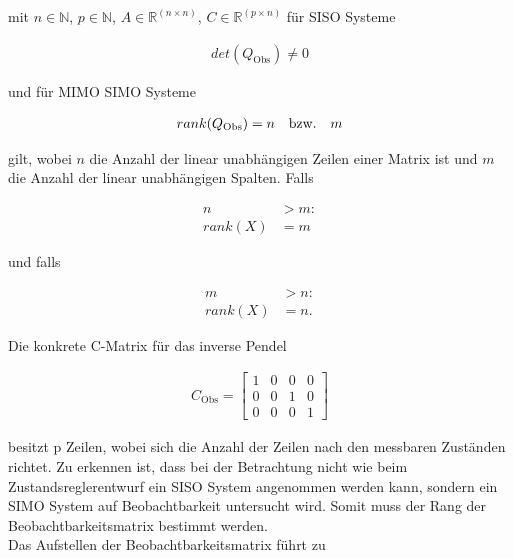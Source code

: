 mit $n\in\mathbb{N}$, $p\in\mathbb{N}$, $A\in\mathbb{R}^{(n\times n)}$, $C\in\mathbb{R}^{(p\times n)}$ für SISO Systeme

\begin{align}
    det(Q_{\mathrm{Obs}}) \neq 0
\end{align}

und für MIMO \bzw SIMO Systeme

\begin{align}
    rank(Q_{\mathrm{Obs}}) = n \quad \text{bzw.} \quad m
\end{align}

gilt, wobei $n$ die Anzahl der linear unabhängigen Zeilen einer Matrix ist und $m$ die Anzahl der linear unabhängigen Spalten. Falls

\begin{align*}
    n &> m: \\
    rank(X) &= m
\end{align*}

und falls

\begin{align*}
    m &> n: \\
    rank(X) &= n.
\end{align*}

Die konkrete C-Matrix für das inverse Pendel

\begin{align}
    C_{\mathrm{Obs}} = 
    \begin{bmatrix}
        1 & 0 & 0 & 0 \\
        0 & 0 & 1 & 0 \\
        0 & 0 & 0 & 1
    \end{bmatrix}
\end{align}

besitzt p Zeilen, wobei sich die Anzahl der Zeilen nach den messbaren Zuständen richtet. Zu erkennen ist, dass bei der Betrachtung nicht wie beim Zustandsreglerentwurf ein SISO System angenommen werden kann, sondern ein SIMO System auf Beobachtbarkeit untersucht wird. Somit muss der Rang der Beobachtbarkeitsmatrix bestimmt werden.\\
Das Aufstellen der Beobachtbarkeitsmatrix führt zu

